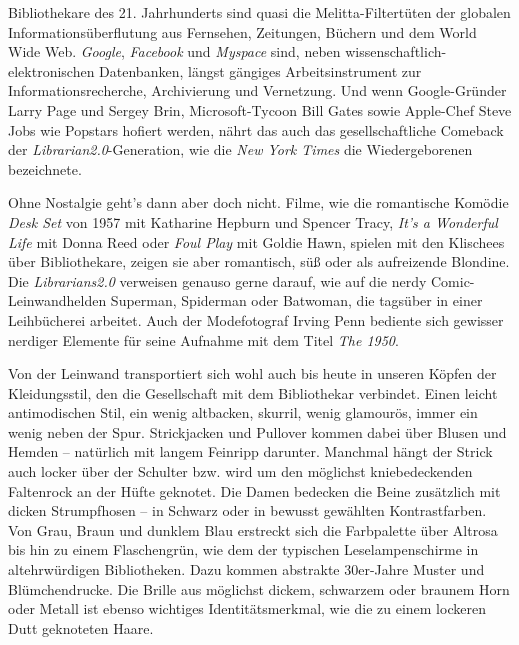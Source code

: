 \documentclass[output=paper]{langscibook}
\begin{document}
Bibliothekare des 21. Jahrhunderts sind quasi die Melitta-Filtertüten
der globalen Informationsüberflutung aus Fernsehen, Zeitungen, Büchern
und dem World Wide Web. \emph{Google}, \emph{Facebook} und
\emph{Myspace} sind, neben wissenschaftlich-elektronischen Datenbanken,
längst gängiges Arbeitsinstrument zur Informationsrecherche,
Archivierung und Vernetzung. Und wenn Google-Gründer Larry Page und
Sergey Brin, Microsoft-Tycoon Bill Gates sowie Apple-Chef Steve Jobs wie
Popstars hofiert werden, nährt das auch das gesellschaftliche Comeback
der \emph{Librarian2.0}-Generation, wie die \emph{New York Times} die
Wiedergeborenen bezeichnete.

Ohne Nostalgie geht's dann aber doch nicht. Filme, wie die romantische
Komödie \emph{Desk Set} von 1957 mit Katharine Hepburn und Spencer
Tracy, \emph{It's a Wonderful Life} mit Donna Reed oder \emph{Foul Play}
mit Goldie Hawn, spielen mit den Klischees über Bibliothekare, zeigen
sie aber romantisch, süß oder als aufreizende Blondine. Die
\emph{Librarians2.0} verweisen genauso gerne darauf, wie auf die nerdy
Comic-Leinwandhelden Superman, Spiderman oder Batwoman, die tagsüber in
einer Leihbücherei arbeitet. Auch der Modefotograf Irving Penn bediente
sich gewisser nerdiger Elemente für seine Aufnahme mit dem Titel
\emph{The 1950}.

Von der Leinwand transportiert sich wohl auch bis heute in unseren
Köpfen der Kleidungsstil, den die Gesellschaft mit dem Bibliothekar
verbindet. Einen leicht antimodischen Stil, ein wenig altbacken,
skurril, wenig glamourös, immer ein wenig neben der Spur. Strickjacken
und Pullover kommen dabei über Blusen und Hemden -- natürlich mit langem
Feinripp darunter. Manchmal hängt der Strick auch locker über der
Schulter bzw. wird um den möglichst kniebedeckenden Faltenrock an der
Hüfte geknotet. Die Damen bedecken die Beine zusätzlich mit dicken
Strumpfhosen -- in Schwarz oder in bewusst gewählten Kontrastfarben. Von
Grau, Braun und dunklem Blau erstreckt sich die Farbpalette über Altrosa
bis hin zu einem Flaschengrün, wie dem der typischen Leselampenschirme
in altehrwürdigen Bibliotheken. Dazu kommen abstrakte 30er-Jahre Muster
und Blümchendrucke. Die Brille aus möglichst dickem, schwarzem oder
braunem Horn oder Metall ist ebenso wichtiges Identitätsmerkmal, wie die
zu einem lockeren Dutt geknoteten Haare.
\end{document}

